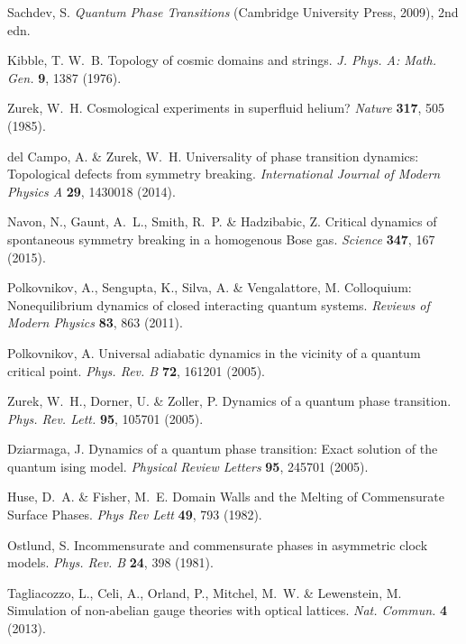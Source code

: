 \documentclass[prl,nobalancelastpage,superscriptaddress,twocolumn,nofootinbib]{revtex4}
\begin{document}

\begin{thebibliography}{}

 Sachdev, S.  \emph{Quantum Phase Transitions} ({Cambridge University Press}, 2009), 2nd edn.

 Kibble, T. W.~B. Topology of cosmic domains and strings. \emph{J. Phys. A: Math. Gen.} \textbf{9}, 1387 (1976).

 Zurek, W.~H. Cosmological experiments in superfluid helium? \emph{Nature} \textbf{317}, 505 (1985).

 del Campo, A. \& Zurek, W.~H. Universality of phase transition dynamics: Topological defects from symmetry breaking. \emph{International Journal of Modern Physics A} \textbf{29}, 1430018 (2014).

 Navon, N., Gaunt, A.~L., Smith, R.~P. \& Hadzibabic, Z. {Critical dynamics of spontaneous symmetry breaking in a homogenous Bose gas}. \emph{Science} \textbf{347}, 167 (2015).

 Polkovnikov, A., Sengupta, K., Silva, A. \& Vengalattore, M. Colloquium: Nonequilibrium dynamics of closed interacting quantum systems. \emph{Reviews of Modern Physics} \textbf{83}, 863 (2011).

 Polkovnikov, A. Universal adiabatic dynamics in the vicinity of a quantum critical point. \emph{Phys. Rev. B} \textbf{72}, 161201 (2005).

 Zurek, W.~H., Dorner, U. \& Zoller, P. Dynamics of a quantum phase transition. \emph{Phys. Rev. Lett.} \textbf{95}, 105701 (2005).

 Dziarmaga, J. Dynamics of a quantum phase transition: Exact solution of the quantum ising model. \emph{Physical Review Letters} \textbf{95}, 245701 (2005).

 Huse, D.~A. \& Fisher, M.~E. {Domain Walls and the Melting of Commensurate Surface Phases}. \emph{Phys Rev Lett} \textbf{49}, 793 (1982).

 Ostlund, S. Incommensurate and commensurate phases in asymmetric clock models. \emph{Phys. Rev. B} \textbf{24}, 398 (1981).

 Tagliacozzo, L., Celi, A., Orland, P., Mitchel, M.~W. \& Lewenstein, M. Simulation of non-abelian gauge theories with optical lattices. \emph{Nat. Commun.} \textbf{4} (2013).


\end{thebibliography}
\end{document}
